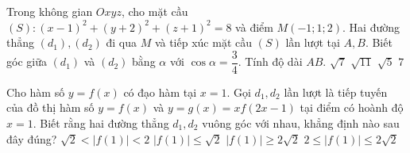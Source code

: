 \begin{ex}%
    Trong không gian $Oxyz$, cho mặt cầu $(S): (x-1)^{2}+(y+2)^{2}+(z+1)^{2}=8$ và điểm $M(-1;1;2)$. Hai đường thẳng $(d_1),(d_2)$ đi qua $M$ và tiếp xúc mặt cầu $(S)$ lần lượt tại $A,B$. Biết góc giữa $(d_1)$ và $(d_2)$ bằng $\alpha$ với $\cos \alpha=\dfrac{3}{4}$. Tính độ dài $AB$.
    \choice
    {\True $\sqrt{7}$}
    {$\sqrt{11}$}
    {$\sqrt{5}$}
    {$7$}
\end{ex}
\begin{ex}%
    Cho hàm số $y=f(x)$ có đạo hàm tại $x=1$. Gọi $d_1,d_2$ lần lượt là tiếp tuyến của đồ thị hàm số $y=f(x)$ và $y=g(x)=xf(2x-1)$ tại điểm có hoành độ $x=1$. Biết rằng hai đường thẳng $d_1,d_2$ vuông góc với nhau, khẳng định nào sau đây đúng?
    \choice
    {$\sqrt{2}<|f(1)|<2$}
    {$|f(1)| \leq \sqrt{2}$}
    {\True $|f(1)| \geq 2\sqrt{2}$}
    {$2\leq |f(1)|\leq 2\sqrt{2}$}
\end{ex}
